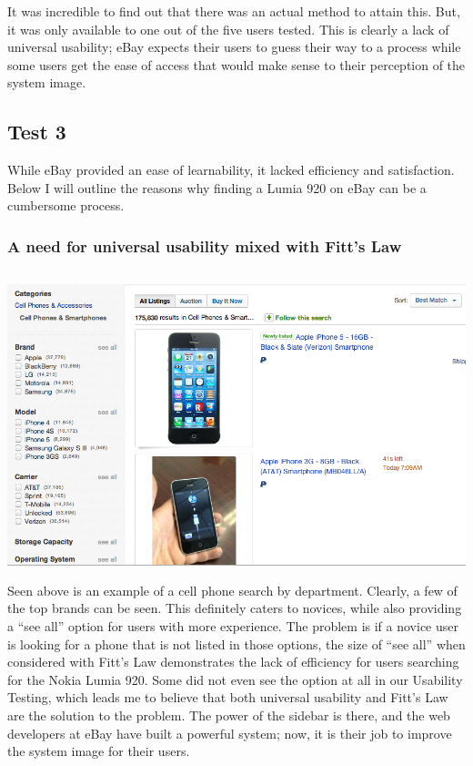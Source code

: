 \documentclass[11pt, oneside]{article}   	%
\begin{document}
It was incredible to find out that there was an actual method to attain this. But, it was only available to one out of the five users tested. This is clearly a lack of universal usability; eBay expects their users to guess their way to a process while some users get the ease of access that would make sense to their perception of the system image.
\subsection{Test 3}
While eBay provided an ease of learnability, it lacked efficiency and satisfaction. Below I will outline the reasons why finding a Lumia 920 on eBay can be a cumbersome process.
\subsubsection{A need for universal usability mixed with Fitt's Law}
\includegraphics[width=6in, height=3.5in]{eBay5}
Seen above is an example of a cell phone search by department. Clearly, a few of the top brands can be seen. This definitely caters to novices, while also providing a ``see all'' option for users with more experience. The problem is if a novice user is looking for a phone that is not listed in those options, the size of ``see all'' when considered with Fitt's Law demonstrates the lack of efficiency for users searching for the Nokia Lumia 920. Some did not even see the option at all in our Usability Testing, which leads me to believe that both universal usability and Fitt's Law are the solution to the problem. The power of the sidebar is there, and the web developers at eBay have built a powerful system; now, it is their job to improve the system image for their users.
\end{document}
